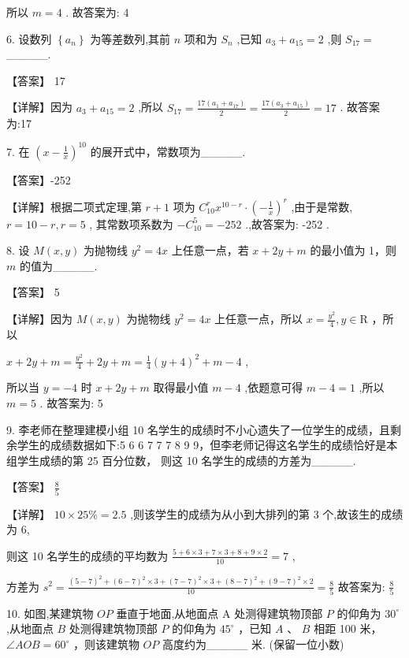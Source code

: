 \documentclass[10pt]{article}
\begin{document}
所以 \(m = 4\) . 故答案为: 4

6. 设数列 \(\left\{  {a}_{n}\right\}\) 为等差数列,其前 \(n\) 项和为 \({S}_{n}\) ,已知 \({a}_{3} + {a}_{15} = 2\) ,则 \({S}_{17} =\) \_\_\_\_\_.

【答案】 17

【详解】因为 \({a}_{3} + {a}_{15} = 2\) ,所以 \({S}_{17} = \frac{{17}\left( {{a}_{1} + {a}_{17}}\right) }{2} = \frac{{17}\left( {{a}_{3} + {a}_{15}}\right) }{2} = {17}\) . 故答案为:17

7. 在 \({\left( x - \frac{1}{x}\right) }^{10}\) 的展开式中，常数项为\_\_\_\_\_.

【答案】-252

【详解】根据二项式定理,第 \(r + 1\) 项为 \({C}_{10}^{r}{x}^{{10} - r} \cdot  {\left( -\frac{1}{x}\right) }^{r}\) ,由于是常数, \(r = {10} - r,r = 5\) , 其常数项系数为 \(- {C}_{10}^{5} =  - {252}\) .,故答案为: -252 .

8. 设 \(M\left( {x,y}\right)\) 为抛物线 \({y}^{2} = {4x}\) 上任意一点，若 \(x + {2y} + m\) 的最小值为 1，则 \(m\) 的值为\_\_\_\_\_.

【答案】 5

【详解】因为 \(M\left( {x,y}\right)\) 为抛物线 \({y}^{2} = {4x}\) 上任意一点，所以 \(x = \frac{{y}^{2}}{4},y \in  \mathrm{R}\) ，所以

\(x + {2y} + m = \frac{{y}^{2}}{4} + {2y} + m = \frac{1}{4}{\left( y + 4\right) }^{2} + m - 4\) ,

所以当 \(y =  - 4\) 时 \(x + {2y} + m\) 取得最小值 \(m - 4\) ,依题意可得 \(m - 4 = 1\) ,所以 \(m = 5\) . 故答案为: 5

9. 李老师在整理建模小组 10 名学生的成绩时不小心遗失了一位学生的成绩，且剩余学生的成绩数据如下:5 6 6 7 7 7 8 9 9，但李老师记得这名学生的成绩恰好是本组学生成绩的第 25 百分位数， 则这 10 名学生的成绩的方差为\_\_\_\_\_.

【答案】 \(\frac{8}{5}\)

【详解】 \({10} \times  {25}\%  = {2.5}\) ,则该学生的成绩为从小到大排列的第 3 个,故该生的成绩为 6,

则这 10 名学生的成绩的平均数为 \(\frac{5 + 6 \times  3 + 7 \times  3 + 8 + 9 \times  2}{10} = 7\) ,

方差为 \({s}^{2} = \frac{{\left( 5 - 7\right) }^{2} + {\left( 6 - 7\right) }^{2} \times  3 + {\left( 7 - 7\right) }^{2} \times  3 + {\left( 8 - 7\right) }^{2} + {\left( 9 - 7\right) }^{2} \times  2}{10} = \frac{8}{5}\) 故答案为: \(\frac{8}{5}\)

10. 如图,某建筑物 \({OP}\) 垂直于地面,从地面点 \(\mathrm{A}\) 处测得建筑物顶部 \(P\) 的仰角为 \({30}^{ \circ  }\) ,从地面点 \(B\) 处测得建筑物顶部 \(P\) 的仰角为 \({45}^{ \circ  }\) ，已知 \(A\) 、 \(B\) 相距 100 米， \(\angle {AOB} = {60}^{ \circ  }\) ，则该建筑物 \({OP}\) 高度约为\_\_\_\_\_ 米. (保留一位小数)
\end{document}
